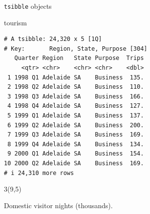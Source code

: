 \documentclass[
  14pt,
  ignorenonframetext,
  aspectratio=169,
]{beamer}
\newenvironment{Shaded}{\begin{snugshade}}{\end{snugshade}}
\newcommand{\NormalTok}[1]{#1}
\renewenvironment{Shaded}{\vspace*{0.15cm}\color{black}\fontsize{10}{10}\sf\begin{snugshade}\color{black}}{\end{snugshade}}
\begin{document}
\begin{frame}[fragile]{\texttt{tsibble} objects}
\protect{}\label{tsibble-objects-2}
\fontsize{10}{11.2}\sf

\begin{Shaded}
\begin{Highlighting}[]
\NormalTok{tourism}
\end{Highlighting}
\end{Shaded}

\begin{verbatim}
# A tsibble: 24,320 x 5 [1Q]
# Key:       Region, State, Purpose [304]
   Quarter Region   State Purpose  Trips
     <qtr> <chr>    <chr> <chr>    <dbl>
 1 1998 Q1 Adelaide SA    Business  135.
 2 1998 Q2 Adelaide SA    Business  110.
 3 1998 Q3 Adelaide SA    Business  166.
 4 1998 Q4 Adelaide SA    Business  127.
 5 1999 Q1 Adelaide SA    Business  137.
 6 1999 Q2 Adelaide SA    Business  200.
 7 1999 Q3 Adelaide SA    Business  169.
 8 1999 Q4 Adelaide SA    Business  134.
 9 2000 Q1 Adelaide SA    Business  154.
10 2000 Q2 Adelaide SA    Business  169.
# i 24,310 more rows
\end{verbatim}


\begin{textblock}{3}(9,5)
\begin{block}{}\fontsize{10}{10}\sf Domestic visitor nights (thousands).\phantom{dg}\end{block}
\end{textblock}
\end{frame}
\end{document}
